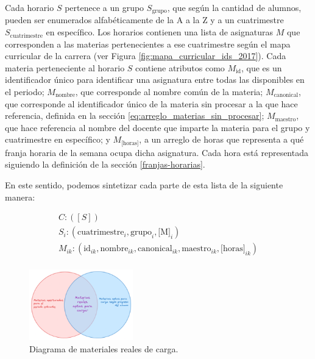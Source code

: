 Cada horario \( S \) pertenece a un grupo \( S_{\text{grupo}} \), que según la cantidad de alumnos, pueden ser enumerados alfabéticamente de la A a la Z y a un cuatrimestre \( S_{\text{cuatrimestre}} \) en específico. Los horarios contienen una lista de asignaturas \( M \) que corresponden a las materias pertenecientes a ese cuatrimestre según el mapa curricular de la carrera (ver Figura \ref{fig:mapa_curricular_ids_2017}). Cada materia perteneciente al horario \( S \) contiene atributos como \( M_{\text{id}} \), que es un identificador único para identificar una asignatura entre todas las disponibles en el periodo; \( M_{\text{nombre}} \), que corresponde al nombre común de la materia; \( M_{\text{canonical}} \), que corresponde al identificador único de la materia sin procesar a la que hace referencia, definida en la sección \ref{eq:arreglo_materias_sin_procesar}; \( M_{\text{maestro}} \), que hace referencia al nombre del docente que imparte la materia para el grupo y cuatrimestre en específico; y \( M_{\text{[horas]}} \), a un arreglo de horas que representa a qué franja horaria de la semana ocupa dicha asignatura. Cada hora está representada siguiendo la definición de la sección \ref{franjas-horarias}.


En este sentido, podemos sintetizar cada parte de esta lista de la siguiente manera:

\begin{gather*} 
    C: ([S]) \\
    S_i: (\text{cuatrimestre}_i, \text{grupo}_i, \text{[M]}_i) \\
    M_{ik}: (\text{id}_{ik}, \text{nombre}_{ik}, \text{canonical}_{ik}, \text{maestro}_{ik}, \text{[horas]}_{ik}) \\
    \label{eq:definicion_lista_de_horarios_por_periodo}
\end{gather*} 
\clearpage
\begin{figure}[h]
    \centering
    \includegraphics[width=0.4\textwidth]{images/Real-Assignatures-to-Load.png}
    \caption{Diagrama de materiales reales de carga.}
    \label{fig:materias_reales_de_carga}
\end{figure}

